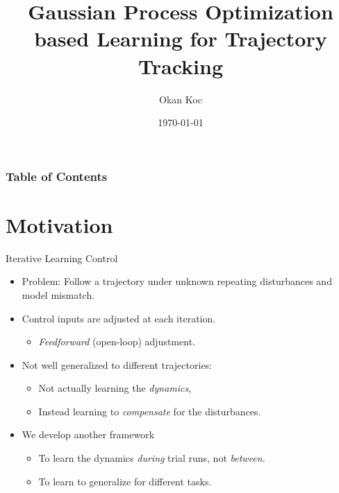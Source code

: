 \documentclass[handout]{beamer}
\title[Learning for Trajectory Tracking]{Gaussian Process Optimization based Learning for Trajectory Tracking}
\author{Okan Koc}
\institute[IDSC]
{
ETH Z\"urich \\
Applied Mathematics \\
\medskip
{\emph{koco@student.ethz.ch}}
}
\date{\today}
\begin{document}
%
\begin{frame}
\titlepage
\end{frame}
%
\begin{frame}
\frametitle{Table of Contents}
\tableofcontents
\end{frame}
%
\section{Motivation}
%
\begin{frame}{Iterative Learning Control}
\begin{itemize}
\item Problem: Follow a trajectory under unknown repeating disturbances and model mismatch. \pause
\item Control inputs are adjusted at each iteration. \pause
	\begin{itemize}
	\item \emph{Feedforward} (open-loop) adjustment. \pause
	\end{itemize}
\item Not well generalized to different trajectories: \pause
	\begin{itemize}
	\item Not actually learning the \emph{dynamics}, \pause
	\item Instead learning to \emph{compensate} for the disturbances. \pause
	\end{itemize}
\item We develop another framework \pause
	\begin{itemize}
	\item To learn the dynamics \emph{during} trial runs, not \emph{between}. \pause
	\item To learn to generalize for different tasks.
	\end{itemize}
\end{itemize}
\end{frame}
%
\end{document}
